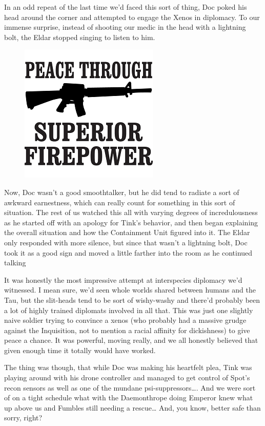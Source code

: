 In an odd repeat of the last time we'd faced this sort of thing, Doc poked his head around the corner and attempted to engage the Xenos in diplomacy. 
To our immense surprise, instead of shooting our medic in the head with a lightning bolt, the Eldar stopped singing to listen to him.

\begin{figure}
	\begin{center}
		\includegraphics[width=\figwidth]{pics/16/28.png}
	\end{center}
\end{figure}
Now, Doc wasn't a good smoothtalker, but he did tend to radiate a sort of awkward earnestness, which can really count for something in this sort of situation. 
The rest of us watched this all with varying degrees of incredulousness as he started off with an apology for Tink's behavior, and then began explaining the overall situation and how the Containment Unit figured into it. 
The Eldar only responded with more silence, but since that wasn't a lightning bolt, Doc took it as a good sign and moved a little farther into the room as he continued talking

It was honestly the most impressive attempt at interspecies diplomacy we'd witnessed. 
I mean sure, we'd seen whole worlds shared between humans and the Tau, but the slit-heads tend to be sort of wishy-washy and there'd probably been a lot of highly trained diplomats involved in all that. 
This was just one slightly naive soldier trying to convince a xenos (who probably had a massive grudge against the Inquisition, not to mention a racial affinity for dickishness) to give peace a chance. 
It was powerful, moving really, and we all honestly believed that given enough time it totally would have worked.

The thing was though, that while Doc was making his heartfelt plea, Tink was playing around with his drone controller and managed to get control of Spot's recon sensors as well as one of the mundane psi-suppressors…. 
And we were sort of on a tight schedule what with the Daemonthrope doing Emperor knew what up above us and Fumbles still needing a rescue… And, you know, better safe than sorry, right?

